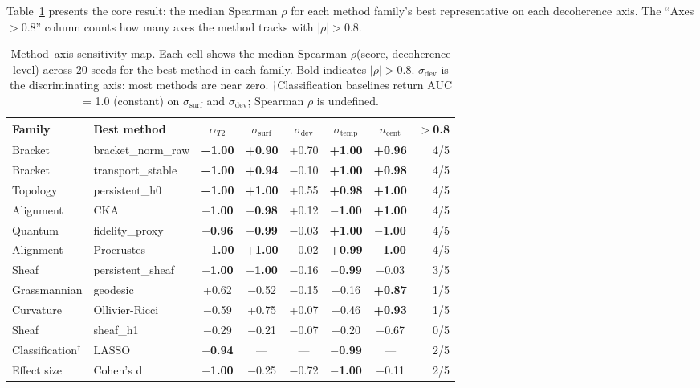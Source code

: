 \documentclass[11pt]{article}
\begin{document}
Table~\ref{tab:sensitivity} presents the core result: the median
Spearman $\rho$ for each method family's best representative on each
decoherence axis.  The ``Axes $> 0.8$'' column counts how many axes
the method tracks with $|\rho| > 0.8$.

\begin{table}[t]
\centering
\caption{Method--axis sensitivity map.  Each cell shows the median
  Spearman $\rho$(score, decoherence level) across 20 seeds for the
  best method in each family.  Bold indicates $|\rho| > 0.8$.
  $\sigma_\text{dev}$ is the discriminating axis: most methods are near
  zero.  $\dagger$Classification baselines return AUC = 1.0 (constant)
  on $\sigma_\text{surf}$ and $\sigma_\text{dev}$; Spearman $\rho$ is
  undefined.}
\label{tab:sensitivity}
\small
\begin{tabular}{@{}llcccccr@{}}
\toprule
Family & Best method & $\alpha_{T2}$ & $\sigma_\text{surf}$ & $\sigma_\text{dev}$ & $\sigma_\text{temp}$ & $n_\text{cent}$ & $>$0.8 \\
\midrule
Bracket & bracket\_norm\_raw & \textbf{+1.00} & \textbf{+0.90} & +0.70 & \textbf{+1.00} & \textbf{+0.96} & 4/5 \\
Bracket & transport\_stable & \textbf{+1.00} & \textbf{+0.94} & $-$0.10 & \textbf{+1.00} & \textbf{+0.98} & 4/5 \\
Topology & persistent\_h0 & \textbf{+1.00} & \textbf{+1.00} & +0.55 & \textbf{+0.98} & \textbf{+1.00} & 4/5 \\
Alignment & CKA & \textbf{$-$1.00} & \textbf{$-$0.98} & +0.12 & \textbf{$-$1.00} & \textbf{+1.00} & 4/5 \\
Quantum & fidelity\_proxy & \textbf{$-$0.96} & \textbf{$-$0.99} & $-$0.03 & \textbf{+1.00} & \textbf{$-$1.00} & 4/5 \\
Alignment & Procrustes & \textbf{+1.00} & \textbf{+1.00} & $-$0.02 & \textbf{+0.99} & \textbf{$-$1.00} & 4/5 \\
Sheaf & persistent\_sheaf & \textbf{$-$1.00} & \textbf{$-$1.00} & $-$0.16 & \textbf{$-$0.99} & $-$0.03 & 3/5 \\
\midrule
Grassmannian & geodesic & +0.62 & $-$0.52 & $-$0.15 & $-$0.16 & \textbf{+0.87} & 1/5 \\
Curvature & Ollivier-Ricci & $-$0.59 & +0.75 & +0.07 & $-$0.46 & \textbf{+0.93} & 1/5 \\
Sheaf & sheaf\_h1 & $-$0.29 & $-$0.21 & $-$0.07 & +0.20 & $-$0.67 & 0/5 \\
\midrule
Classification$^\dagger$ & LASSO & \textbf{$-$0.94} & --- & --- & \textbf{$-$0.99} & --- & 2/5 \\
Effect size & Cohen's d & \textbf{$-$1.00} & $-$0.25 & $-$0.72 & \textbf{$-$1.00} & $-$0.11 & 2/5 \\
\bottomrule
\end{tabular}
\end{table}
\end{document}
